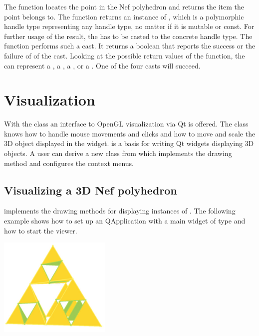 The  function locates the point  in the
Nef polyhedron and returns the item the point belongs to. The
 function returns an instance of ,
which is a polymorphic handle type representing any handle type, no
matter if it is mutable or const.  For further usage of the result,
the  has to be casted to the concrete handle type.
The  function performs such a cast. It returns a
boolean that reports the success or the failure of of the cast.
Looking at the possible return values of the  function,
the  can represent a , a
, a , or a
. One of the four casts will succeed.


\section{Visualization}

With the  class an interface to OpenGL
visualization via Qt is offered. The class knows how to handle
mouse movements and clicks and how to move and scale the 
3D object displayed in the widget.  is
a basis for writing Qt widgets displaying 3D objects. 
A user can derive a new class from  
which implements the drawing method and configures the context menus.

\subsection{Visualizing a 3D Nef polyhedron}

 implements the drawing methods for displaying 
instances of
. The following example shows how to set up 
an QApplication with a main widget of type  and
how to start the viewer.

\begin{ccTexOnly}
    \begin{center}
      \parbox{0.4\textwidth}{%
          \includegraphics[width=0.4\textwidth]{Nef_3/fig/visualization_SNC}%
      }
    \end{center}
\end{ccTexOnly}

